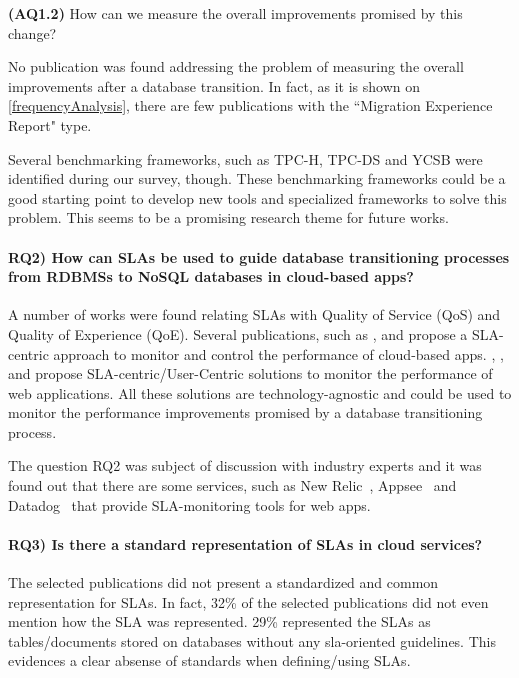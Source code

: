 \documentclass{article}
\begin{document}
{\textbf{(AQ1.2)} How can we measure the overall improvements promised by this change?

No publication was found addressing the problem of measuring the overall improvements after a database transition. In fact, as it is shown on \ref{frequencyAnalysis}, there are few publications with the ``Migration Experience Report"  type. 

Several benchmarking frameworks, such as TPC-H, TPC-DS and YCSB were identified\cite{6616442} during our survey, though. These benchmarking frameworks could be a good starting point to develop new tools and specialized frameworks to solve this problem. This seems to be a promising research theme for future works.

\paragraph*{\textbf{RQ2)} How can SLAs be used to guide database transitioning processes from RDBMSs to NoSQL databases in cloud-based apps? }

A number of works were found relating SLAs with Quality of Service (QoS) and Quality of Experience (QoE). Several publications, such as \cite{Xiong:2012:DMR:2213598.2213614}, \cite{Konstantinou:2012:TEN:2213836.2213943} and \cite{Klems:2012:RQM:2477172.2477488} propose a SLA-centric approach to monitor and control the performance of cloud-based apps. 
\cite{6253526}, \cite{6461875}, \cite{6511780} and \cite{Xiong:2011:APA:2038916.2038931} propose SLA-centric/User-Centric solutions to monitor the performance of web applications. All these solutions are technology-agnostic and could be used to monitor the performance improvements promised by a database transitioning process.

The question RQ2 was subject of discussion with industry experts and it was found out that there are some services, such as New Relic~\cite{newrelic}, Appsee~\cite{appsee} and Datadog~\cite{datadog} that provide SLA-monitoring tools for web apps.

\paragraph*{\textbf{RQ3)} Is there a standard representation of SLAs in cloud services? }

The selected publications did not present a standardized and common representation for SLAs. In fact, 32\% of the selected publications did not even mention how the SLA was represented. 29\% represented the SLAs as tables/documents stored on databases without any sla-oriented guidelines. This evidences a clear absense of standards when defining/using SLAs.

}
\end{document}
